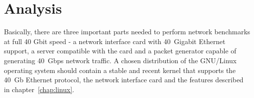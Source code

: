 
\chapter{Analysis}\label{chap:analysis}
Basically, there are three important parts needed to perform network benchmarks at full 40 Gbit speed -
a network interface card with 40~Gigabit Ethernet support, a server compatible with the card and a packet generator
capable of generating 40~Gbps network traffic.
A chosen distribution of the GNU/Linux operating system should contain a stable and
recent kernel that supports the 40~Gb Ethernet protocol, the network interface card
and the features described in chapter~\ref{chap:linux}.









